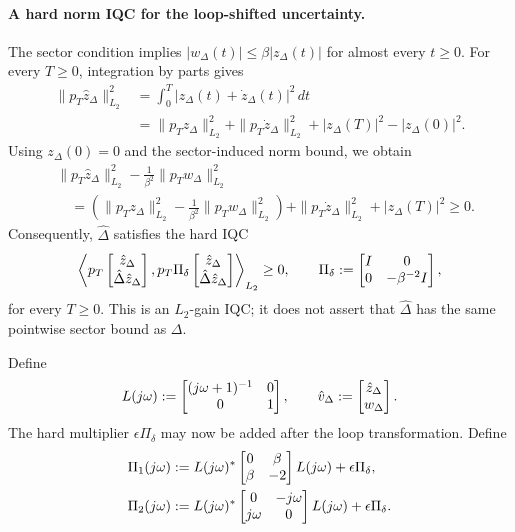 \documentclass[journal,10pt,doublecolumn,twoside,a4paper]{IEEEtran}
\begin{document}
\paragraph{A hard norm IQC for the loop-shifted uncertainty.}
The sector condition implies
$|w_\Delta(t)|\leq\beta|z_\Delta(t)|$ for almost every $t\geq0$.
For every $T\geq0$, integration by parts gives
\begin{align*}
\|p_T\hat z_\Delta\|_{L_2}^2
&=\int_0^T|z_\Delta(t)+\dot z_\Delta(t)|^2\,dt\\
&=\|p_Tz_\Delta\|_{L_2}^2
  +\|p_T\dot z_\Delta\|_{L_2}^2
  +|z_\Delta(T)|^2-|z_\Delta(0)|^2.
\end{align*}
Using $z_\Delta(0)=0$ and the sector-induced norm bound, we obtain
\begin{align*}
&\|p_T\hat z_\Delta\|_{L_2}^2
-\frac{1}{\beta^2}\|p_Tw_\Delta\|_{L_2}^2\\
&\quad=
\left(\|p_Tz_\Delta\|_{L_2}^2
-\frac{1}{\beta^2}\|p_Tw_\Delta\|_{L_2}^2\right)
+\|p_T\dot z_\Delta\|_{L_2}^2+|z_\Delta(T)|^2
\geq0.
\end{align*}
Consequently, $\hat\Delta$ satisfies the hard IQC
\begin{equation}\label{eq:loop-shifted-norm-iqc}
\left\langle p_T\begin{bmatrix}\hat z_\Delta\\\hat\Delta\hat z_\Delta\end{bmatrix}, p_T\Pi_\delta\begin{bmatrix}\hat z_\Delta\\\hat\Delta\hat z_\Delta\end{bmatrix} \right\rangle_{L_2}
\geq0,
\qquad
\Pi_\delta:=\begin{bmatrix}I&0\\0&-\beta^{-2}I\end{bmatrix},
\end{equation}
for every $T\geq0$. This is an $L_2$-gain IQC; it does not assert that
$\hat\Delta$ has the same pointwise sector bound as $\Delta$.

Define
\begin{equation*}
L(j\omega):=\begin{bmatrix}(j\omega+1)^{-1}&0\\0&1\end{bmatrix},
\qquad
\hat v_\Delta:=\begin{bmatrix}\hat z_\Delta\\w_\Delta\end{bmatrix}.
\end{equation*}
The hard multiplier $\epsilon \Pi_\delta$ may now be added after the loop
transformation. Define
\begin{align*}
\Pi_1(j\omega)
&:=L(j\omega)^*\begin{bmatrix}0&\beta\\\beta&-2\end{bmatrix}L(j\omega)
+\epsilon \Pi_\delta,\\
\Pi_2(j\omega)
&:=L(j\omega)^*\begin{bmatrix}0&-j\omega\\j\omega&0\end{bmatrix}L(j\omega)
+\epsilon \Pi_\delta.
\end{align*}
\end{document}
